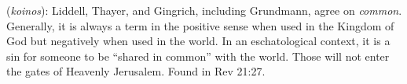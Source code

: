 \item[Common,]

(\textit{koinos}):
Liddell, Thayer, and Gingrich, including Grundmann, agree on \emph{common}. Generally, it is always a term in the positive sense when used in the Kingdom of God but negatively when used in the world. In an eschatological context, it is a sin for someone to be ``shared in common'' with the world. Those will not enter the gates of Heavenly Jerusalem.
Found in Rev 21:27.
